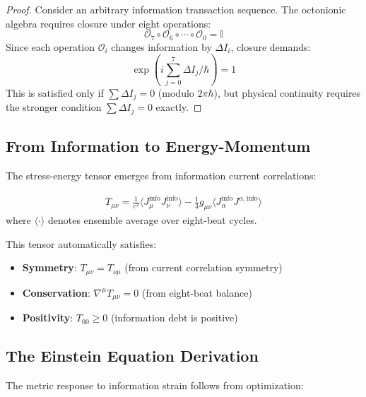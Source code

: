 \documentclass[12pt]{article}
\begin{document}
\begin{proof}
Consider an arbitrary information transaction sequence. The octonionic algebra requires closure under eight operations:
\begin{equation}
\mathcal{O}_7 \circ \mathcal{O}_6 \circ \cdots \circ \mathcal{O}_0 = \mathbb{I}
\end{equation}
Since each operation $\mathcal{O}_i$ changes information by $\Delta I_i$, closure demands:
\begin{equation}
\exp\left(i\sum_{j=0}^{7} \Delta I_j / \hbar\right) = 1
\end{equation}
This is satisfied only if $\sum \Delta I_j = 0$ (modulo $2\pi\hbar$), but physical continuity requires the stronger condition $\sum \Delta I_j = 0$ exactly.
\end{proof}

\subsection{From Information to Energy-Momentum}

The stress-energy tensor emerges from information current correlations:

\begin{theorem}
\begin{align}
T_{\mu\nu} = \frac{1}{c^2} \langle J_{\mu}^{\text{info}} J_{\nu}^{\text{info}} \rangle - \frac{1}{4}g_{\mu\nu} \langle J_\alpha^{\text{info}} J^{\alpha,\text{info}} \rangle
\end{align}
where $\langle \cdot \rangle$ denotes ensemble average over eight-beat cycles.
\end{theorem}

This tensor automatically satisfies:
\begin{itemize}
\item \textbf{Symmetry}: $T_{\mu\nu} = T_{\nu\mu}$ (from current correlation symmetry)
\item \textbf{Conservation}: $\nabla^\mu T_{\mu\nu} = 0$ (from eight-beat balance)
\item \textbf{Positivity}: $T_{00} \geq 0$ (information debt is positive)
\end{itemize}

\subsection{The Einstein Equation Derivation}

The metric response to information strain follows from optimization:
\end{document}
